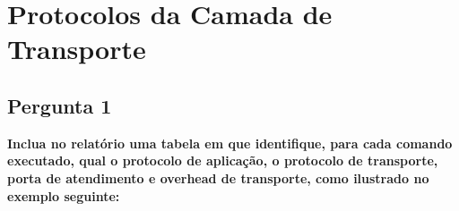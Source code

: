 \documentclass[11pt]{article}
\begin{document}
\begin{titlepage}
\begin{center}
\begin{figure}[hbt!]
                \centering
                \captionsetup{A89572}
            \endminipage\hfill
                \centering
                \captionsetup{A89597}
            \endminipage
        \end{figure}
    \end{center}
\end{titlepage}

\tableofcontents
\thispagestyle{empty}
\cleardoublepage

\setcounter{page}{1}


\section{Protocolos da Camada de Transporte}
\vspace{0.5cm}


\subsection{Pergunta 1}

\textbf{Inclua no relatório uma tabela em que identifique, para cada comando executado, qual o protocolo de aplicação, o protocolo de transporte, porta de atendimento e overhead de transporte, como ilustrado no exemplo seguinte:}
\end{document}
